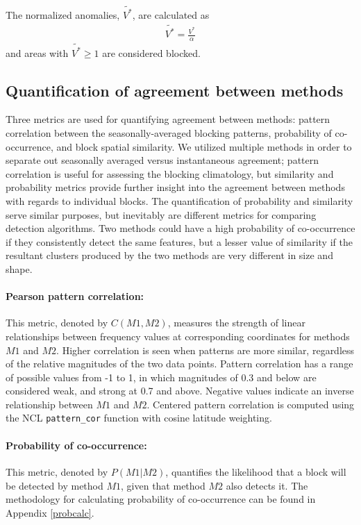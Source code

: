 \documentclass[smallextended]{svjour3}       %
\numberwithin{equation}{section}
\begin{document}
The normalized anomalies, $\widetilde{V^*}$, are calculated as
 \begin{eqnarray}
 \widetilde{V^*} = \frac{V^*}{\alpha}
 \end{eqnarray}
\noindent 
and areas with $\widetilde{V^*}\geq 1$ are considered blocked.

\subsection{Quantification of agreement between methods}\label{simsec}

Three metrics are used for quantifying agreement between methods: 
pattern correlation between the seasonally-averaged blocking patterns, probability of co-occurrence, and block spatial similarity.  We utilized multiple methods in order to separate out seasonally averaged versus instantaneous agreement; pattern correlation is useful for assessing the blocking climatology, but similarity and probability metrics provide further insight into the agreement between methods with regards to individual blocks. The quantification of probability and similarity serve similar purposes, but inevitably are different metrics for comparing detection algorithms. Two methods could have a high probability of co-occurrence if they consistently detect the same features, but a lesser value of similarity if the resultant clusters produced by the two methods are very different in size and shape.

\paragraph{Pearson pattern correlation:} This metric, denoted by $C(M1,M2)$, measures the strength of linear relationships between  frequency values at corresponding coordinates for methods $M1$ and $M2$. Higher correlation is seen when patterns are more similar, regardless of the relative magnitudes of the two data points.{ \color{blue}Pattern correlation has a range of possible values from -1 to 1, in which magnitudes of 0.3 and below are considered weak, and strong at 0.7 and above. Negative values indicate an inverse relationship between $M1$ and $M2$.} Centered pattern correlation is computed using the NCL \texttt{pattern\_cor} function with cosine latitude weighting.

\paragraph{Probability of co-occurrence:} This metric, denoted by $P(M1|M2)$, quantifies the likelihood that a block will be detected by method $M1$, given that method $M2$ also detects it. The methodology for calculating probability of co-occurrence can be found in Appendix \ref{probcalc}. 
\end{document}

